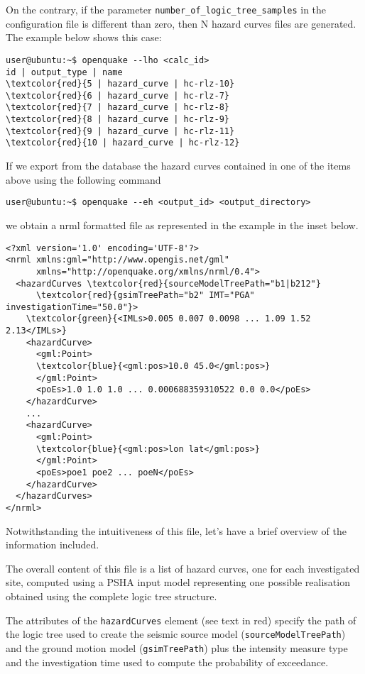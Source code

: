 On the contrary, if the parameter \texttt{number\_of\_logic\_tree\_samples}
in the configuration file is different than zero, then N hazard curves files 
are generated. The example below shows this case:
\begin{Verbatim}[frame=single, commandchars=\\\{\}, fontsize=\small]
user@ubuntu:~$ openquake --lho <calc_id>
id | output_type | name
\textcolor{red}{5 | hazard_curve | hc-rlz-10}
\textcolor{red}{6 | hazard_curve | hc-rlz-7}
\textcolor{red}{7 | hazard_curve | hc-rlz-8}
\textcolor{red}{8 | hazard_curve | hc-rlz-9}
\textcolor{red}{9 | hazard_curve | hc-rlz-11}
\textcolor{red}{10 | hazard_curve | hc-rlz-12}
\end{Verbatim}
If we export from the database the hazard curves contained in 
one of the items above using the following command
\begin{Verbatim}[frame=single, commandchars=\\\{\}, fontsize=\small]
user@ubuntu:~$ openquake --eh <output_id> <output_directory>
\end{Verbatim}
we obtain a nrml formatted file as represented in the example
in the inset below.
\begin{Verbatim}[frame=single, commandchars=\\\{\}, fontsize=\small]
<?xml version='1.0' encoding='UTF-8'?>
<nrml xmlns:gml="http://www.opengis.net/gml" 
      xmlns="http://openquake.org/xmlns/nrml/0.4">
  <hazardCurves \textcolor{red}{sourceModelTreePath="b1|b212"} 
      \textcolor{red}{gsimTreePath="b2" IMT="PGA" investigationTime="50.0"}>
    \textcolor{green}{<IMLs>0.005 0.007 0.0098 ... 1.09 1.52 2.13</IMLs>}
    <hazardCurve>
      <gml:Point>
      \textcolor{blue}{<gml:pos>10.0 45.0</gml:pos>}
      </gml:Point>
      <poEs>1.0 1.0 1.0 ... 0.000688359310522 0.0 0.0</poEs>
    </hazardCurve>
    ...
    <hazardCurve>
      <gml:Point>
      \textcolor{blue}{<gml:pos>lon lat</gml:pos>}
      </gml:Point>
      <poEs>poe1 poe2 ... poeN</poEs>
    </hazardCurve>
  </hazardCurves>
</nrml>
\end{Verbatim}
Not\-with\-stand\-ing the intuitiveness of this file, let's have a brief 
overview of the information included.

The overall content of this file is a list of hazard curves, one for
each investigated site, computed using a PSHA input model representing
one possible realisation obtained using the complete logic tree structure. 

The attributes of the \texttt{hazardCurves} element (see text in 
red) specify the path of the logic tree 
used to create the seismic source model (\texttt{source\-Model\-TreePath}) 
and the ground motion model (\texttt{gsim\-Tree\-Path}) plus the 
intensity measure type and the investigation time used to compute 
the probability of exceedance. 

